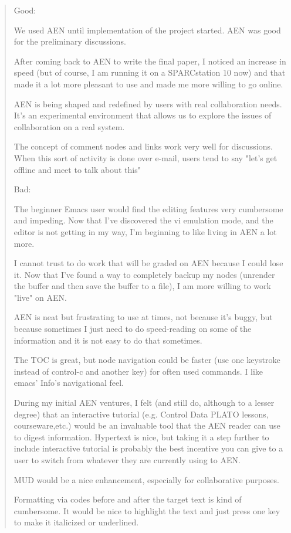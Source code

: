\begin{quote}
Good:

We used AEN until implementation of the project started.  AEN was good for the
preliminary discussions.

After coming back to AEN to write the final paper, I noticed an increase in speed (but
of course, I am running it on a SPARCstation 10 now) and that made it a lot more
pleasant to use and made me more willing to go online.

AEN is being shaped and redefined by users with real collaboration needs.  It's an
experimental environment that allows us to explore the issues of collaboration on a real
system.

The concept of comment nodes and links work very well for discussions.  When this sort
of activity is done over e-mail, users tend to say "let's get offline and meet to talk
about this"

Bad:

The beginner Emacs user would find the editing features very cumbersome and impeding.
Now that I've discovered the vi emulation mode, and the editor is not getting in my way,
I'm beginning to like living in AEN a lot more.

I cannot trust to do work that will be graded on AEN because I could lose it.  Now that
I've found a way to completely backup my nodes (unrender the buffer and then save the
buffer to a file), I am more willing to work "live" on AEN.

AEN is neat but frustrating to use at times, not because it's buggy, but because
sometimes I just need to do speed-reading on some of the information and it is not easy
to do that sometimes.

The TOC is great, but node navigation could be faster (use one keystroke instead of
control-c and another key) for often used commands.  I like emacs' Info's navigational
feel.

During my initial AEN ventures, I felt (and still do, although to a lesser degree) that
an interactive tutorial (e.g. Control Data PLATO lessons, courseware,etc.)  would be an
invaluable tool that the AEN reader can use to digest information.  Hypertext is nice,
but taking it a step further to include interactive tutorial is probably the best
incentive you can give to a user to switch from whatever they are currently using to
AEN.

MUD would be a nice enhancement, especially for collaborative purposes.

Formatting via codes before and after the target text is kind of cumbersome.  It would
be nice to highlight the text and just press one key to make it italicized or
underlined.
\end{quote}

